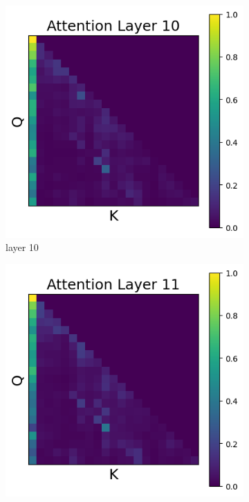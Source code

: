 \documentclass[11pt]{article}
\begin{document}
\begin{figure}[t]
    \begin{subfigure}[t]{0.24\textwidth}
    \centering
    \includegraphics[width=1.4\columnwidth]{figures/intervention5/layer_10.png}
    \caption{layer 10}
  \end{subfigure}\hfill
    \begin{subfigure}[t]{0.24\textwidth}
    \centering
    \includegraphics[width=1.4\columnwidth]{figures/intervention5/layer_11.png}

\end{subfigure}
\end{figure}
\end{document}
